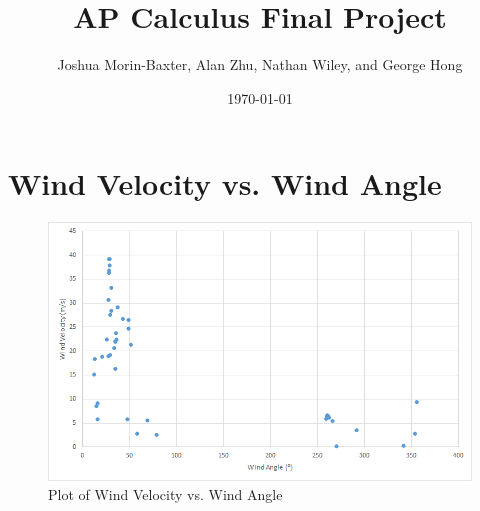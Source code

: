 \documentclass{journal}
\begin{document}
\title{AP Calculus Final Project}
\author{Joshua Morin-Baxter, Alan Zhu, Nathan Wiley, and George Hong}
\date{\today}

\maketitle

\part{Wind Velocity vs. Wind Angle}
\begin{figure}[H]
  \centering
  \includegraphics[width=\textwidth]{alan-data.png}
  \caption{Plot of Wind Velocity vs. Wind Angle}
\end{figure}
\end{document}
